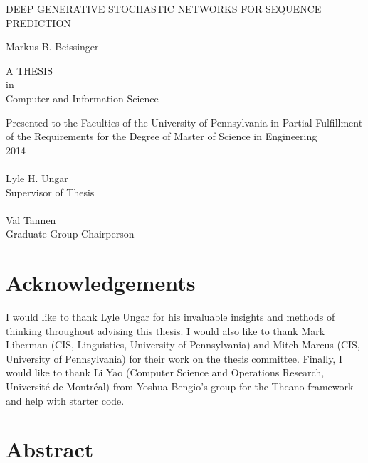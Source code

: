 \documentclass[12pt, titlepage]{report}
\begin{document}
	\doublespacing
	
	\begin{titlepage}
		\begin{center}
			{\singlespacing \LARGE \uppercase{Deep Generative Stochastic Networks for Sequence Prediction}\\[24pt]}
			
			{\Large Markus B. Beissinger\\[12pt]}
			
			\uppercase{a thesis}\\[12pt]					
			in\\			
			{\Large Computer and Information Science\\[36pt]}
			
			Presented to the Faculties of the University of Pennsylvania in Partial Fulfillment of the Requirements for the Degree of Master of Science in Engineering\\[12pt]
			
			2014\\[60pt]
			
			\singlespacing
			\makebox[2.5in]{\hrulefill}\\
			Lyle H. Ungar\\
			Supervisor of Thesis\\[48pt]
			
			\makebox[2.5in]{\hrulefill}\\
			Val Tannen\\
			Graduate Group Chairperson
			
			\doublespacing
		\end{center}
	\end{titlepage}
	

	\chapter*{Acknowledgements}
	I would like to thank Lyle Ungar for his invaluable insights and methods of thinking throughout advising this thesis. I would also like to thank Mark Liberman (CIS, Linguistics, University of Pennsylvania) and Mitch Marcus (CIS, University of Pennsylvania) for their work on the thesis committee. Finally, I would like to thank Li Yao (Computer Science and Operations Research, Universit\'{e} de Montr\'{e}al) from Yoshua Bengio\rq{}s group for the Theano framework and help with starter code.
	
	\chapter*{Abstract}
	
	
\end{document}

